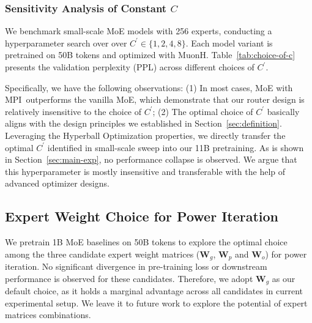 \documentclass{llmxive}
\providecommand{\bm}[1]{\boldsymbol{#1}}
\providecommand{\name}{MPI}
\providecommand{\mW}{{\bm{W}}}
\begin{document}
\subsubsection{Sensitivity Analysis of Constant \texorpdfstring{$C$}{C}}
We benchmark small-scale MoE models with 256 experts, conducting a hyperparameter search over over $C^\prime \in \{1,2,4,8\} $.
Each model variant is pretrained on 50B tokens and optimized with MuonH.
Table~\ref{tab:choice-of-c} presents the validation perplexity (PPL) across different choices of $C^\prime$.
\begin{table}[t]
    \centering
    \small
    \caption{Validation perplexity across choices of $C^\prime$.}
    \label{tab:choice-of-c}
\end{table}

Specifically, we have the following observations:
(1) In most cases, MoE with \name\ outperforms the vanilla MoE, which demonstrate that our router design is relatively insensitive to the choice of $C^\prime$; 
(2) The optimal choice of $C^\prime$ basically aligns with the design principles we established in Section~\ref{sec:definition}.
Leveraging the Hyperball Optimization properties, we directly transfer the optimal $C^\prime$ identified in small-scale sweep into our 11B pretraining. 
As is shown in Section~\ref{sec:main-exp}, no performance collapse is observed.
We argue that this hyperparameter is mostly insensitive and transferable with the help of advanced optimizer designs.


\subsection{Expert Weight Choice for Power Iteration}
We pretrain 1B MoE baselines on 50B tokens to explore the optimal choice  among the three candidate expert weight matrices ($\mW_g$, $\mW_p$ and $\mW_o$) for power iteration.
No significant divergence in pre-training loss or downstream performance is observed for these candidates.
Therefore, we adopt $\mW_g$ as our default choice, as it holds a marginal advantage across all candidates in current experimental setup.
We leave it to future work to explore the potential of expert matrices combinations.
\end{document}
